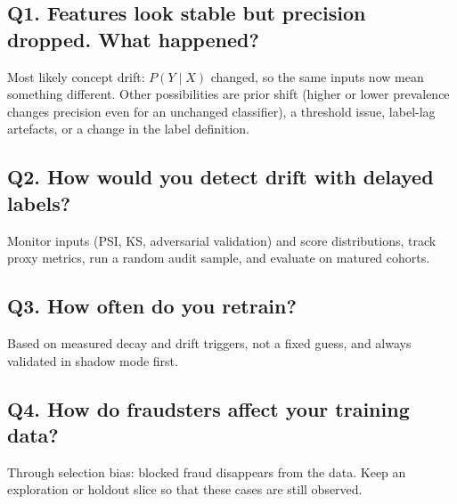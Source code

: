 \documentclass[11pt]{article}
\begin{document}
\subsection*{Q1. Features look stable but precision dropped. What happened?}

Most likely concept drift: \(P(Y\mid X)\) changed, so the same inputs now mean something different. Other possibilities are prior shift (higher or lower prevalence changes precision even for an unchanged classifier), a threshold issue, label-lag artefacts, or a change in the label definition.

\subsection*{Q2. How would you detect drift with delayed labels?}

Monitor inputs (PSI, KS, adversarial validation) and score distributions, track proxy metrics, run a random audit sample, and evaluate on matured cohorts.

\subsection*{Q3. How often do you retrain?}

Based on measured decay and drift triggers, not a fixed guess, and always validated in shadow mode first.

\subsection*{Q4. How do fraudsters affect your training data?}

Through selection bias: blocked fraud disappears from the data. Keep an exploration or holdout slice so that these cases are still observed.
\end{document}
